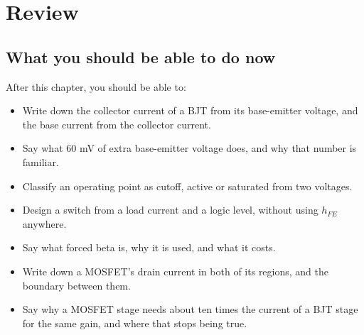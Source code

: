 

\section{Review}
\label{c5:sec:review}

\subsection*{What you should be able to do now}
After this chapter, you should be able to:
\begin{itemize}
  \item Write down the collector current of a BJT from its base-emitter voltage, and the base current from the collector current.
  \item Say what 60 mV of extra base-emitter voltage does, and why that number is familiar.
  \item Classify an operating point as cutoff, active or saturated from two voltages.
  \item Design a switch from a load current and a logic level, without using $h_{FE}$ anywhere.
  \item Say what forced beta is, why it is used, and what it costs.
  \item Write down a MOSFET's drain current in both of its regions, and the boundary between them.
  \item Say why a MOSFET stage needs about ten times the current of a BJT stage for the same gain, and where that stops being true.
\end{itemize}

